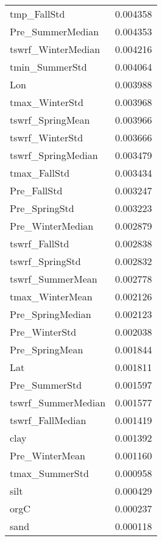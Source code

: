 \begin{tabular}{lr}
tmp_FallStd & 0.004358 \\
Pre_SummerMedian & 0.004353 \\
tswrf_WinterMedian & 0.004216 \\
tmin_SummerStd & 0.004064 \\
Lon & 0.003988 \\
tmax_WinterStd & 0.003968 \\
tswrf_SpringMean & 0.003966 \\
tswrf_WinterStd & 0.003666 \\
tswrf_SpringMedian & 0.003479 \\
tmax_FallStd & 0.003434 \\
Pre_FallStd & 0.003247 \\
Pre_SpringStd & 0.003223 \\
Pre_WinterMedian & 0.002879 \\
tswrf_FallStd & 0.002838 \\
tswrf_SpringStd & 0.002832 \\
tswrf_SummerMean & 0.002778 \\
tmax_WinterMean & 0.002126 \\
Pre_SpringMedian & 0.002123 \\
Pre_WinterStd & 0.002038 \\
Pre_SpringMean & 0.001844 \\
Lat & 0.001811 \\
Pre_SummerStd & 0.001597 \\
tswrf_SummerMedian & 0.001577 \\
tswrf_FallMedian & 0.001419 \\
clay & 0.001392 \\
Pre_WinterMean & 0.001160 \\
tmax_SummerStd & 0.000958 \\
silt & 0.000429 \\
orgC & 0.000237 \\
sand & 0.000118 \\
\bottomrule
\end{tabular}
